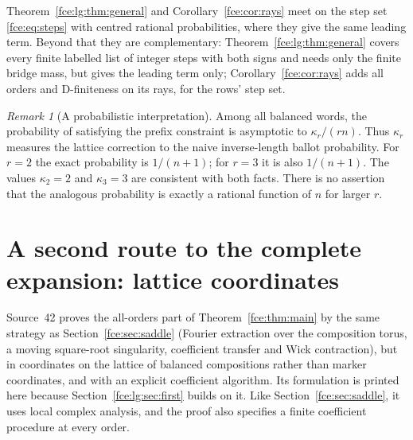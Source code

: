 \documentclass[11pt,a4paper]{article}
\numberwithin{equation}{section}
\theoremstyle{definition}\newtheorem{definition}[theorem]{Definition}
\theoremstyle{remark}\newtheorem{remark}[theorem]{Remark}
\begin{document}
Theorem~\ref{fce:lg:thm:general} and Corollary~\ref{fce:cor:rays} meet on
the step set \eqref{fce:eq:steps} with centred rational probabilities,
where they give the same leading term. Beyond that they are complementary:
Theorem~\ref{fce:lg:thm:general} covers every finite labelled list of
integer steps with both signs and needs only the finite bridge mass, but
gives the leading term only; Corollary~\ref{fce:cor:rays} adds all orders
and D-finiteness on its rays, for the rows' step set.

\begin{remark}[A probabilistic interpretation]\label{fce:lg:rem:probability}
Among all balanced words, the probability of satisfying the prefix
constraint is asymptotic to $\kappa_r/(rn)$. Thus $\kappa_r$ measures the
lattice correction to the naive inverse-length ballot probability. For
$r=2$ the exact probability is $1/(n+1)$; for $r=3$ it is also $1/(n+1)$.
The values $\kappa_2=2$ and $\kappa_3=3$ are consistent with both facts.
There is no assertion that the analogous probability is exactly a rational
function of $n$ for larger $r$.
\end{remark}

\section{A second route to the complete expansion: lattice coordinates}\label{fce:lg:sec:allorders}
Source~42 proves the all-orders part of Theorem~\ref{fce:thm:main} by the
same strategy as Section~\ref{fce:sec:saddle} (Fourier extraction over the
composition torus, a moving square-root singularity, coefficient transfer
and Wick contraction), but in coordinates on the lattice of balanced
compositions rather than marker coordinates, and with an explicit
coefficient algorithm. Its formulation is printed here because
Section~\ref{fce:lg:sec:first} builds on it. Like
Section~\ref{fce:sec:saddle}, it uses local complex analysis, and the proof
also specifies a finite coefficient procedure at every order.
\end{document}
